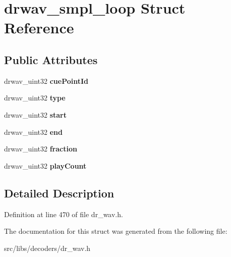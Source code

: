 \hypertarget{structdrwav__smpl__loop}{\section{drwav\-\_\-smpl\-\_\-loop Struct Reference}
\label{structdrwav__smpl__loop}
}
\subsection*{Public Attributes}
\begin{DoxyCompactItemize}
\item 
\hypertarget{structdrwav__smpl__loop_a494799db87ae8d4ff075f1283cabca0f}{drwav\-\_\-uint32 {\bfseries cue\-Point\-Id}}\label{structdrwav__smpl__loop_a494799db87ae8d4ff075f1283cabca0f}

\item 
\hypertarget{structdrwav__smpl__loop_a920eae2dd73283716ed3a3ccd90e5ec2}{drwav\-\_\-uint32 {\bfseries type}}\label{structdrwav__smpl__loop_a920eae2dd73283716ed3a3ccd90e5ec2}

\item 
\hypertarget{structdrwav__smpl__loop_a573a4644042d63189fc9420053ed031e}{drwav\-\_\-uint32 {\bfseries start}}\label{structdrwav__smpl__loop_a573a4644042d63189fc9420053ed031e}

\item 
\hypertarget{structdrwav__smpl__loop_a2b2de7e23e94ba275296d9b6ae8c3db6}{drwav\-\_\-uint32 {\bfseries end}}\label{structdrwav__smpl__loop_a2b2de7e23e94ba275296d9b6ae8c3db6}

\item 
\hypertarget{structdrwav__smpl__loop_afc450d1301cff73d5052e508f513b544}{drwav\-\_\-uint32 {\bfseries fraction}}\label{structdrwav__smpl__loop_afc450d1301cff73d5052e508f513b544}

\item 
\hypertarget{structdrwav__smpl__loop_acbde654bad7680c6b8ef01cbd7b3a7b7}{drwav\-\_\-uint32 {\bfseries play\-Count}}\label{structdrwav__smpl__loop_acbde654bad7680c6b8ef01cbd7b3a7b7}

\end{DoxyCompactItemize}


\subsection{Detailed Description}


Definition at line 470 of file dr\-\_\-wav.\-h.



The documentation for this struct was generated from the following file\-:\begin{DoxyCompactItemize}
\item 
src/libs/decoders/dr\-\_\-wav.\-h\end{DoxyCompactItemize}
